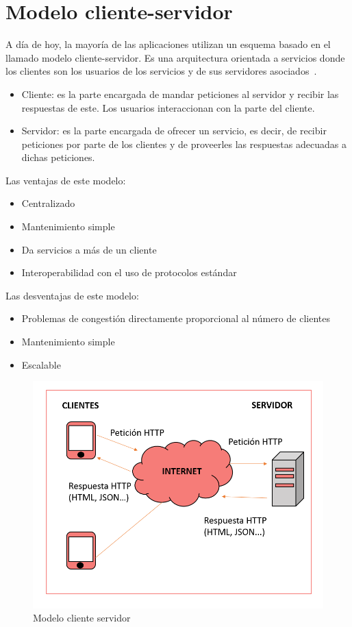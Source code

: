 \documentclass[a4paper, 12pt]{book}
\begin{document}
\section{Modelo cliente-servidor} 
\label{sec:seccion1}
A día de hoy, la mayoría de las aplicaciones utilizan un esquema basado en el llamado modelo cliente-servidor. Es una arquitectura orientada a servicios donde los clientes son los usuarios de los servicios y de sus servidores asociados~\cite{castro2015arquitectura}.
 \begin{itemize}
          \item
         Cliente: es la parte encargada de mandar peticiones al servidor y recibir las respuestas de este. Los usuarios interaccionan con la parte del cliente.
          \item
          Servidor: es la parte encargada de ofrecer un servicio, es decir, de recibir peticiones por parte de los clientes y de proveerles las respuestas adecuadas a dichas peticiones.~\cite{lizama2016redes} 
     \end{itemize}
     
Las ventajas de este modelo:
\begin{itemize}
    \item Centralizado
    \item Mantenimiento simple
    \item Da servicios a más de un cliente 
    \item Interoperabilidad con el uso de protocolos estándar
\end{itemize}

Las desventajas de este modelo:
\begin{itemize}
    \item Problemas de congestión directamente proporcional al número de clientes
    \item Mantenimiento simple
    \item Escalable~\cite{lizama2016redes} 
\end{itemize}

\begin{figure}[h]
        \centering
        \includegraphics[scale=0.4]{img/Cliente-Servidor.png}
        \caption{Modelo cliente servidor}
        \label{figura:cliente-servidor}
    \end{figure}
\end{document}
